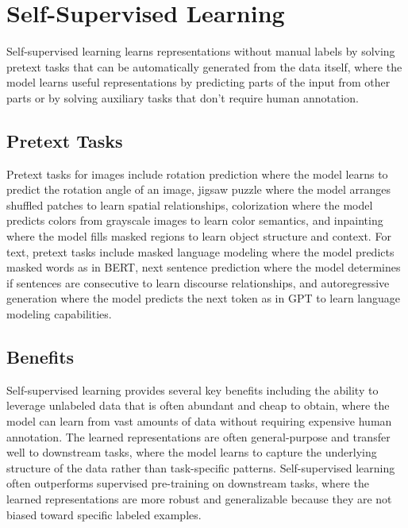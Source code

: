 
\section{Self-Supervised Learning }
\label{sec:self-supervised}

Self-supervised learning learns representations without manual labels by solving pretext tasks that can be automatically generated from the data itself, where the model learns useful representations by predicting parts of the input from other parts or by solving auxiliary tasks that don't require human annotation.

\subsection{Pretext Tasks}

Pretext tasks for images include rotation prediction where the model learns to predict the rotation angle of an image, jigsaw puzzle where the model arranges shuffled patches to learn spatial relationships, colorization where the model predicts colors from grayscale images to learn color semantics, and inpainting where the model fills masked regions to learn object structure and context. For text, pretext tasks include masked language modeling where the model predicts masked words as in BERT, next sentence prediction where the model determines if sentences are consecutive to learn discourse relationships, and autoregressive generation where the model predicts the next token as in GPT to learn language modeling capabilities.

\subsection{Benefits}

Self-supervised learning provides several key benefits including the ability to leverage unlabeled data that is often abundant and cheap to obtain, where the model can learn from vast amounts of data without requiring expensive human annotation. The learned representations are often general-purpose and transfer well to downstream tasks, where the model learns to capture the underlying structure of the data rather than task-specific patterns. Self-supervised learning often outperforms supervised pre-training on downstream tasks, where the learned representations are more robust and generalizable because they are not biased toward specific labeled examples.

